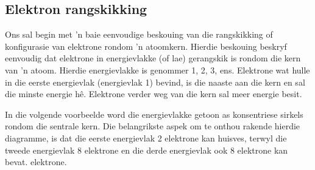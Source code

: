             \subsection*{Elektron rangskikking}
            \nopagebreak
            \label{m38741*id9722401}Ons sal begin met  'n baie eenvoudige beskouing van die rangskikking of konfigurasie van elektrone rondom  'n atoomkern. Hierdie beskouing beskryf eenvoudig dat elektrone in energievlakke (of lae) gerangskik is rondom die kern van   'n atoom. Hierdie energievlakke is genommer 1, 2, 3, ens. Elektrone wat hulle in die eerste energievlak (energievlak 1) bevind, is die naaste aan die kern en sal die minste energie h\^{e}. Elektrone verder weg van die kern sal meer energie besit.\par 
\label{m38741*id259357}In die volgende voorbeelde word die energievlakke getoon as konsentriese sirkels rondom die sentrale kern. Die belangrikste aspek om te onthou rakende hierdie diagramme, is dat die eerste energievlak 2 elektrone kan huisves, terwyl die tweede energievlak 8 elektrone en die derde energievlak ook 8 elektrone kan bevat. elektrone.\par 
